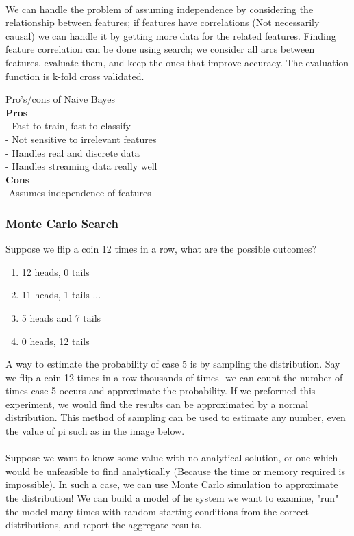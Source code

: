 \documentclass{chezarticle}
\begin{document}
\\
We can handle the problem of assuming independence by considering the relationship between features; if features have correlations (Not necessarily causal) we can handle it by getting more data for the related features. Finding feature correlation can be done using search; we consider all arcs between features, evaluate them, and keep the ones that improve accuracy. The evaluation function is k-fold cross validated.
\begin{note}
Pro's/cons of Naive Bayes\\
\textbf{Pros}\\
- Fast to train, fast to classify\\
- Not sensitive to irrelevant features\\
- Handles real and discrete data\\
- Handles streaming data really well\\
\textbf{Cons}\\
-Assumes independence of features
\end{note}

\subsubsection{Monte Carlo Search}
Suppose we flip a coin 12 times in a row, what are the possible outcomes?
\begin{enumerate}
    \item 12 heads, 0 tails
    \item 11 heads, 1 tails
    ...
    \item 5 heads and 7 tails
    \item 0 heads, 12 tails
\end{enumerate}
A way to estimate the probability of case 5 is by sampling the distribution. Say we flip a coin 12 times in a row  thousands of times- we can count the number of times case 5 occurs and approximate the probability. If we preformed this experiment, we would find the results can be approximated by a normal distribution. This method of sampling can be used to estimate any number, even the value of pi such as in the image below. \\
\\
Suppose we want to know some value with no analytical solution, or one which would be unfeasible to find analytically (Because the time or memory required is impossible). In such a case, we can use Monte Carlo simulation to approximate the distribution! We can build a model of he system we want to examine, "run" the model many times with random starting conditions from the correct distributions, and report the aggregate results. 
\end{document}
